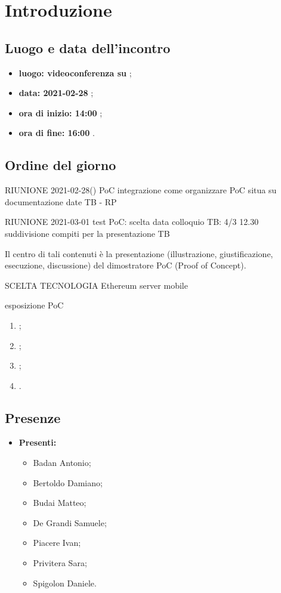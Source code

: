 \section*{Introduzione}
\subsection*{Luogo e data dell'incontro}
\begin{itemize}
	\item \textbf{luogo: videoconferenza su } ;
	\item \textbf{data: 2021-02-28} ;
	\item \textbf{ora di inizio: 14:00} ;
	\item \textbf{ora di fine: 16:00} .
\end{itemize}

\subsection*{Ordine del giorno}
RIUNIONE 2021-02-28()
PoC integrazione
come organizzare PoC
situa su documentazione
date TB - RP

RIUNIONE 2021-03-01
test PoC:
scelta data colloquio TB: 4/3 12.30
suddivisione compiti per la presentazione TB

Il centro di tali contenuti è la presentazione (illustrazione, giustificazione, esecuzione, discussione) del dimostratore PoC (Proof of Concept).

SCELTA TECNOLOGIA
Ethereum
server
mobile

esposizione PoC
\begin{enumerate}
	\item ;
	\item ;
	\item ;
	\item .
\end{enumerate}

\subsection*{Presenze}
\begin{itemize}
	\item \textbf{Presenti:}
	\begin{itemize}
		\item Badan Antonio;
		\item Bertoldo Damiano;
		\item Budai Matteo;
		\item De Grandi Samuele;
		\item Piacere Ivan;
		\item Privitera Sara;
		\item Spigolon Daniele.
	\end{itemize}
\end{itemize}

